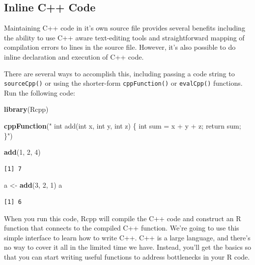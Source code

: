 \documentclass[]{krantz}
\makeatletter
\newenvironment{Shaded}{\begin{snugshade}}{\end{snugshade}}
\newcommand{\DecValTok}[1]{\textcolor[rgb]{0.06,0.06,0.06}{#1}}
\newcommand{\KeywordTok}[1]{\textcolor[rgb]{0.27,0.27,0.27}{\textbf{#1}}}
\newcommand{\NormalTok}[1]{#1}
\newcommand{\StringTok}[1]{\textcolor[rgb]{0.5,0.5,0.5}{#1}}
\newenvironment{kframe}{%
\medskip{}
\setlength{\fboxsep}{.8em}
 \def\at@end@of@kframe{}%
 \ifinner\ifhmode%
  \def\at@end@of@kframe{\end{minipage}}%
  \begin{minipage}{\columnwidth}%
 \fi\fi%
 \def\FrameCommand##1{\hskip\@totalleftmargin \hskip-\fboxsep
 \colorbox{shadecolor}{##1}\hskip-\fboxsep
     \hskip-\linewidth \hskip-\@totalleftmargin \hskip\columnwidth}%
 \MakeFramed {\advance\hsize-\width
   \@totalleftmargin\z@ \linewidth\hsize
   \@setminipage}}%
 {\par\unskip\endMakeFramed%
 \at@end@of@kframe}
\renewenvironment{Shaded}{\begin{kframe}}{\end{kframe}}
\makeatother
\begin{document}
\hypertarget{inline-c-code}{%
\subsection{Inline C++ Code}\label{inline-c-code}}

Maintaining C++ code in it's own source file provides several benefits including the ability to use C++ aware text-editing tools and straightforward mapping of compilation errors to lines in the source file. However, it's also possible to do inline declaration and execution of C++ code.

There are several ways to accomplish this, including passing a code string to \texttt{sourceCpp()} or using the shorter-form \texttt{cppFunction()} or \texttt{evalCpp()} functions. Run the following code:

\begin{Shaded}
\begin{Highlighting}[]
\KeywordTok{library}\NormalTok{(Rcpp)}

\KeywordTok{cppFunction}\NormalTok{(}\StringTok{"}
\StringTok{  int add(int x, int y, int z) \{}
\StringTok{  int sum = x + y + z;}
\StringTok{  return sum;}
\StringTok{  \}"}\NormalTok{)}

\KeywordTok{add}\NormalTok{(}\DecValTok{1}\NormalTok{, }\DecValTok{2}\NormalTok{, }\DecValTok{4}\NormalTok{)}
\end{Highlighting}
\end{Shaded}

\begin{verbatim}
[1] 7
\end{verbatim}

\begin{Shaded}
\begin{Highlighting}[]
\NormalTok{a <-}\StringTok{ }\KeywordTok{add}\NormalTok{(}\DecValTok{3}\NormalTok{, }\DecValTok{2}\NormalTok{, }\DecValTok{1}\NormalTok{)}
\NormalTok{a}
\end{Highlighting}
\end{Shaded}

\begin{verbatim}
[1] 6
\end{verbatim}

When you run this code, Rcpp will compile the C++ code and construct an R function that connects to the compiled C++ function. We're going to use this simple interface to learn how to write C++. C++ is a large language, and there's no way to cover it all in the limited time we have. Instead, you'll get the basics so that you can start writing useful functions to address bottlenecks in your R code.
\end{document}
